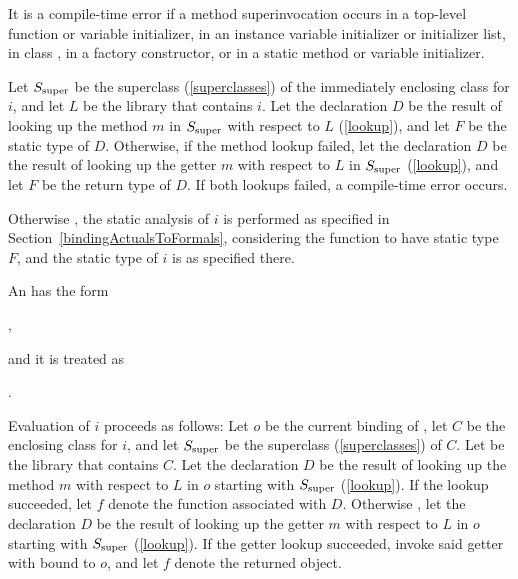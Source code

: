\documentclass[makeidx]{article}
\begin{document}
{\LMHash{}%
It is a compile-time error if a method superinvocation occurs
in a top-level function or variable initializer,
in an instance variable initializer or initializer list,
in class ,
in a factory constructor,
or in a static method or variable initializer.

{ %

\def\SuperClass{\ensuremath{S_{\mbox{\scriptsize{}super}}}}

\LMHash{}%
\BlindDefineSymbol{\SuperClass, L}%
Let \SuperClass{} be the superclass (\ref{superclasses})
of the immediately enclosing class for $i$,
%
and let $L$ be the library that contains $i$.
Let the declaration $D$ be
the result of looking up the method $m$ in \SuperClass{}
with respect to $L$ (\ref{lookup}),
and let $F$ be the static type of $D$.
Otherwise, if the method lookup failed,
let the declaration $D$ be the result of looking up
the getter $m$ with respect to $L$ in \SuperClass{}
(\ref{lookup}),
and let $F$ be the return type of $D$.
If both lookups failed, a compile-time error occurs.

\LMHash{}%
Otherwise
,
the static analysis of $i$ is performed
as specified in Section~\ref{bindingActualsToFormals},
considering the function to have static type $F$,
and the static type of $i$ is as specified there.


\LMHash{}%
An
has the form

\noindent
{},

\noindent
and it is treated as

\noindent
{}.


\LMHash{}%
\BlindDefineSymbol{o, C, \SuperClass}%
Evaluation of $i$ proceeds as follows:
Let $o$ be the current binding of \THIS,
let $C$ be the enclosing class for $i$,
and let \SuperClass{} be the superclass (\ref{superclasses}) of $C$.
Let  be the library that contains $C$.
%
Let the declaration $D$ be the result of looking up
the method $m$ with respect to $L$ in $o$ starting with \SuperClass{}
(\ref{lookup}).
If the lookup succeeded,
let $f$ denote the function associated with $D$.
%
Otherwise
,
let the declaration $D$ be the result of looking up
the getter $m$ with respect to $L$ in $o$ starting with \SuperClass{}
(\ref{lookup}).
If the getter lookup succeeded,
invoke said getter with \THIS{} bound to $o$,
and let $f$ denote the returned object.

}}
\end{document}
